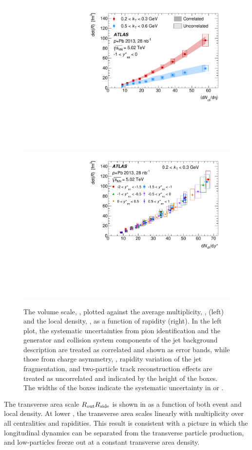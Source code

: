 \begin{figure}[ht]
\centering
\includegraphics[width=0.49\linewidth]{canqosl_detR_vs_avg_mult.pdf}
\includegraphics[width=0.49\linewidth]{canqosl_detR_kt1_vs_mult.pdf}
\caption{The volume scale, \detR, plotted against the average multiplicity, \avgdNdeta, (left) and the local density, \dNdy, as a function of rapidity (right). In the left plot, the systematic uncertainties from pion identification and the generator and collision system components of the jet background description are treated as correlated and shown as error bands, while those from charge asymmetry, \Reff, rapidity variation of the jet fragmentation, and two-particle track reconstruction effects are treated as uncorrelated and indicated by the height of the boxes. The widths of the boxes indicate the systematic uncertainty in \avgdNdeta or \dNdy.}
\label{fig:results_detR_dndeta}
\end{figure}

The transverse area scale $R_{\mathrm{out}}R_{\mathrm{side}}$ is shown in  as a function of both event and local density. At lower \kt, the transverse area scales linearly with multiplicity over all centralities and rapidities. This result is consistent with a picture in which the longitudinal dynamics can be separated from the transverse particle production, and low-\kt particles freeze out at a constant transverse area density.


